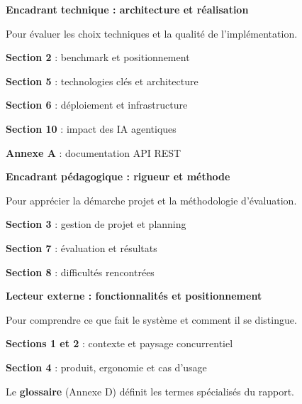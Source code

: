 \documentclass[12pt,a4paper]{article}
\newcommand{\NewMajorPart}{\clearpage}
\begin{document}
\vspace{0.6cm}

\textbf{Encadrant technique : architecture et réalisation}

\vspace{0.15cm}
Pour évaluer les choix techniques et la qualité de l'implémentation.
\begin{sq}
  \item \textbf{Section 2} : benchmark et positionnement
  \item \textbf{Section 5} : technologies clés et architecture
  \item \textbf{Section 6} : déploiement et infrastructure
  \item \textbf{Section 10} : impact des IA agentiques
  \item \textbf{Annexe A} : documentation API REST
\end{sq}

\vspace{0.6cm}

\textbf{Encadrant pédagogique : rigueur et méthode}

\vspace{0.15cm}
Pour apprécier la démarche projet et la méthodologie d'évaluation.
\begin{sq}
  \item \textbf{Section 3} : gestion de projet et planning
  \item \textbf{Section 7} : évaluation et résultats
  \item \textbf{Section 8} : difficultés rencontrées
\end{sq}

\vspace{0.6cm}

\textbf{Lecteur externe : fonctionnalités et positionnement}

\vspace{0.15cm}
Pour comprendre ce que fait le système et comment il se distingue.
\begin{sq}
  \item \textbf{Sections 1 et 2} : contexte et paysage concurrentiel
  \item \textbf{Section 4} : produit, ergonomie et cas d'usage
\end{sq}

\vspace{0.6cm}

Le \textbf{glossaire} (Annexe D) définit les termes spécialisés du rapport.

\NewMajorPart
\end{document}
